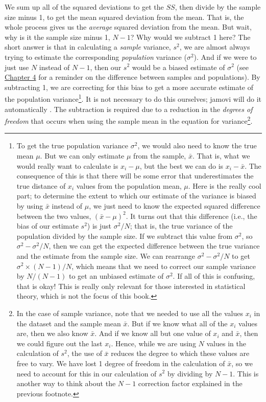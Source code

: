 \documentclass[
  openany]{scrbook}
\begin{document}
We sum up all of the squared deviations to get the \(SS\), then divide by the sample size minus 1, to get the mean squared deviation from the mean.
That is, the whole process gives us the \emph{average} squared deviation from the mean.
But wait, why is it the sample size minus 1, \(N - 1\)?
Why would we subtract 1 here?
The short answer is that in calculating a \emph{sample} variance, \(s^{2}\), we are almost always trying to estimate the corresponding \emph{population} variance (\(\sigma^{2}\)).
And if we were to just use \(N\) instead of \(N - 1\), then our \(s^{2}\) would be a biased estimate of \(\sigma^{2}\) (see \protect\hyperlink{Chapter_4}{Chapter 4} for a reminder on the difference between samples and populations).
By subtracting 1, we are correcting for this bias to get a more accurate estimate of the population variance\footnote{To get the true population variance \(\sigma^{2}\), we would also need to know the true mean \(\mu\). But we can only estimate \(\mu\) from the sample, \(\bar{x}\). That is, what we would really want to calculate is \(x_{i} - \mu\), but the best we can do is \(x_{i} - \bar{x}\). The consequence of this is that there will be some error that underestimates the true distance of \(x_{i}\) values from the population mean, \(\mu\). Here is the really cool part; to determine the extent to which our estimate of the variance is biased by using \(\bar{x}\) instead of \(\mu\), we just need to know the expected squared difference between the two values, \((\bar{x} - \mu)^{2}\). It turns out that this difference (i.e., the bias of our estimate \(s^{2}\)) is just \(\sigma^{2} / N\); that is, the true variance of the population divided by the sample size. If we subtract this value from \(\sigma^{2}\), so \(\sigma^{2} - \sigma^{2}/N\), then we can get the expected difference between the true variance and the estimate from the sample size. We can rearrange \(\sigma^{2} - \sigma^{2}/N\) to get \(\sigma^{2} \times (N - 1)/N\), which means that we need to correct our sample variance by \(N / (N-1)\) to get an unbiased estimate of \(\sigma^{2}\). If all of this is confusing, that is okay! This is really only relevant for those interested in statistical theory, which is not the focus of this book.}.
It is not necessary to do this ourselves; jamovi will do it automatically \citep{Jamovi2022}.
The subtraction is required due to a reduction in the \emph{degrees of freedom} that occurs when using the sample mean in the equation for variance\footnote{In the case of sample variance, note that we needed to use all the values \(x_{i}\) in the dataset and the sample mean \(\bar{x}\). But if we know what all of the \(x_{i}\) values are, then we also know \(\bar{x}\). And if we know all but one value of \(x_{i}\) and \(\bar{x}\), then we could figure out the last \(x_{i}\). Hence, while we are using \(N\) values in the calculation of \(s^{2}\), the use of \(\bar{x}\) reduces the degree to which these values are free to vary. We have lost 1 degree of freedom in the calculation of \(\bar{x}\), so we need to account for this in our calculation of \(s^{2}\) by dividing by \(N - 1\). This is another way to think about the \(N - 1\) correction factor \citep{Sokal1995} explained in the previous footnote.}.
\end{document}
